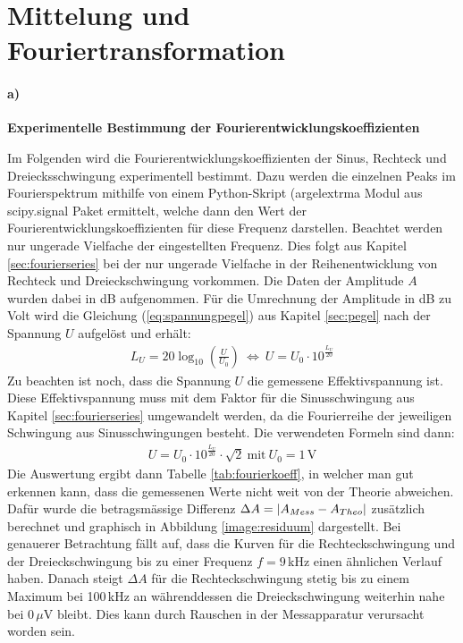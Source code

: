 
\section{Mittelung und Fouriertransformation}
\label{sec:mittelungAndTrafo}

\paragraph{a)}\textbf{Experimentelle Bestimmung der Fourierentwicklungskoeffizienten}

Im Folgenden wird die Fourierentwicklungskoeffizienten der Sinus, Rechteck und Dreiecksschwingung experimentell bestimmt. Dazu werden die einzelnen Peaks im Fourierspektrum mithilfe von einem Python-Skript (argelextrma Modul aus scipy.signal Paket ermittelt, welche dann den Wert der Fourierentwicklungskoeffizienten für diese Frequenz darstellen. Beachtet werden nur ungerade Vielfache der eingestellten Frequenz. Dies folgt aus Kapitel \ref{sec:fourierseries} bei der nur ungerade Vielfache in der Reihenentwicklung von Rechteck und Dreieckschwingung vorkommen. Die Daten der Amplitude $A$ wurden dabei in dB aufgenommen. Für die Umrechnung der Amplitude in dB zu Volt wird die Gleichung (\ref{eq:spannungpegel}) aus Kapitel \ref{sec:pegel} nach der Spannung $U$ aufgelöst und erhält:
\begin{gather}
    L_U = 20 \log_{10}\left(\frac{U}{U_0}\right)~\Leftrightarrow~U = U_0 \cdot 10^{\frac{L_U}{20}}
\end{gather}
Zu beachten ist noch, dass die Spannung $U$ die gemessene Effektivspannung ist. Diese Effektivspannung muss mit dem Faktor für die Sinusschwingung aus Kapitel \ref{sec:fourierseries} umgewandelt werden, da die Fourierreihe der jeweiligen Schwingung aus Sinusschwingungen besteht. Die verwendeten Formeln sind dann:
\begin{gather}
    U = U_0 \cdot 10^{\frac{L_U}{20}} \cdot \sqrt{2}  ~\text{mit}~U_0=1\,\text{V}
    \label{eq:umrechnung}
\end{gather}
Die Auswertung ergibt dann Tabelle \ref{tab:fourierkoeff}, in welcher man gut erkennen kann, dass die gemessenen Werte nicht weit von der Theorie abweichen. Dafür wurde die betragsmässige Differenz $\Delta A = \abs{A_{Mess}-A_{Theo}}$ zusätzlich berechnet und graphisch in Abbildung \ref{image:residuum} dargestellt. Bei genauerer Betrachtung fällt auf, dass die Kurven für die Rechteckschwingung und der Dreieckschwingung bis zu einer Frequenz $f=9$\,kHz einen ähnlichen Verlauf haben. Danach steigt $\Delta A$ für die Rechteckschwingung stetig bis zu einem Maximum bei 100\,kHz an währenddessen die Dreieckschwingung weiterhin nahe bei 0\,$\mu$V bleibt. Dies kann durch Rauschen in der Messapparatur verursacht worden sein.
